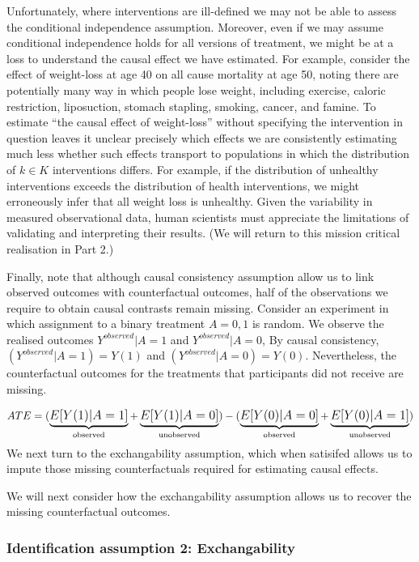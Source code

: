 \documentclass[
  singlecolumn]{report}
\begin{document}
Unfortunately, where interventions are ill-defined we may not be able to
assess the conditional independence assumption. Moreover, even if we may
assume conditional independence holds for all versions of treatment, we
might be at a loss to understand the causal effect we have estimated.
For example, consider the effect of weight-loss at age 40 on all cause
mortality at age 50, noting there are potentially many way in which
people lose weight, including exercise, caloric restriction,
liposuction, stomach stapling, smoking, cancer, and famine. To estimate
``the causal effect of weight-loss'' without specifying the intervention
in question leaves it unclear precisely which effects we are
consistently estimating much less whether such effects transport to
populations in which the distribution of \(k \in K\) interventions
differs. For example, if the distribution of unhealthy interventions
exceeds the distribution of health interventions, we might erroneously
infer that all weight loss is unhealthy. Given the variability in
measured observational data, human scientists must appreciate the
limitations of validating and interpreting their results. (We will
return to this mission critical realisation in Part 2.)

Finally, note that although causal consistency assumption allow us to
link observed outcomes with counterfactual outcomes, half of the
observations we require to obtain causal contrasts remain missing.
Consider an experiment in which assignment to a binary treatment
\(A = {0,1}\) is random. We observe the realised outcomes
\(Y^{observed}|A = 1\) and \(Y^{observed}|A = 0\), By causal
consistency, \((Y^{observed}|A = 1) = Y(1)\) and
\((Y^{observed}|A = 0) = Y(0)\). Nevertheless, the counterfactual
outcomes for the treatments that participants did not receive are
missing.

\[
ATE = \large(\underbrace{E[Y(1)|A = 1]}_\text{observed} + \underbrace{E[Y(1)|A = 0]}_\text{unobserved}\large) - \large(\underbrace{E[Y(0)|A = 0]}_\text{observed}  + \underbrace{E[Y(0)|A = 1]}_\text{unobserved}\large)
\] We next turn to the exchangability assumption, which when satisifed
allows us to impute those missing counterfactuals required for
estimating causal effects.

We will next consider how the exchangability assumption allows us to
recover the missing counterfactual outcomes.

\hypertarget{identification-assumption-2-exchangability}{%
\subsubsection{Identification assumption 2:
Exchangability}\label{identification-assumption-2-exchangability}}
\end{document}
